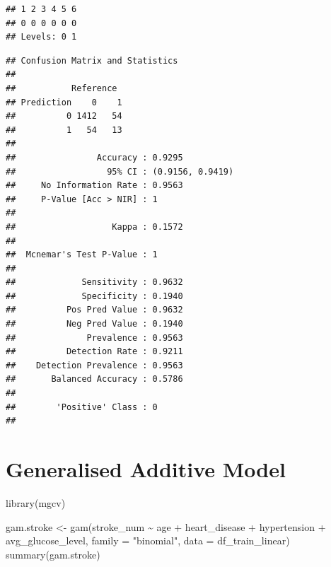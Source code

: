 \documentclass[
]{article}
\newenvironment{Shaded}{\begin{snugshade}}{\end{snugshade}}
\newcommand{\AttributeTok}[1]{\textcolor[rgb]{0.77,0.63,0.00}{#1}}
\newcommand{\CommentTok}[1]{\textcolor[rgb]{0.56,0.35,0.01}{\textit{#1}}}
\newcommand{\FloatTok}[1]{\textcolor[rgb]{0.00,0.00,0.81}{#1}}
\newcommand{\FunctionTok}[1]{\textcolor[rgb]{0.00,0.00,0.00}{#1}}
\newcommand{\NormalTok}[1]{#1}
\newcommand{\OtherTok}[1]{\textcolor[rgb]{0.56,0.35,0.01}{#1}}
\newcommand{\SpecialCharTok}[1]{\textcolor[rgb]{0.00,0.00,0.00}{#1}}
\newcommand{\StringTok}[1]{\textcolor[rgb]{0.31,0.60,0.02}{#1}}
\renewcommand{\=}[1]{\stackrel{#1}{=}}
\theoremstyle{definition}
\theoremstyle{remark}
\begin{document}
\begin{verbatim}
## 1 2 3 4 5 6 
## 0 0 0 0 0 0 
## Levels: 0 1
\end{verbatim}

\begin{Shaded}
\end{Shaded}

\begin{verbatim}
## Confusion Matrix and Statistics
## 
##           Reference
## Prediction    0    1
##          0 1412   54
##          1   54   13
##                                           
##                Accuracy : 0.9295          
##                  95% CI : (0.9156, 0.9419)
##     No Information Rate : 0.9563          
##     P-Value [Acc > NIR] : 1               
##                                           
##                   Kappa : 0.1572          
##                                           
##  Mcnemar's Test P-Value : 1               
##                                           
##             Sensitivity : 0.9632          
##             Specificity : 0.1940          
##          Pos Pred Value : 0.9632          
##          Neg Pred Value : 0.1940          
##              Prevalence : 0.9563          
##          Detection Rate : 0.9211          
##    Detection Prevalence : 0.9563          
##       Balanced Accuracy : 0.5786          
##                                           
##        'Positive' Class : 0               
## 
\end{verbatim}

\hypertarget{generalised-additive-model}{%
\section{Generalised Additive Model}\label{generalised-additive-model}}

\begin{Shaded}
\begin{Highlighting}[]
\FunctionTok{library}\NormalTok{(mgcv)}

\NormalTok{gam.stroke }\OtherTok{\textless{}{-}} \FunctionTok{gam}\NormalTok{(stroke\_num }\SpecialCharTok{\textasciitilde{}}\NormalTok{ age }\SpecialCharTok{+}\NormalTok{ heart\_disease }\SpecialCharTok{+}\NormalTok{ hypertension }\SpecialCharTok{+}\NormalTok{ avg\_glucose\_level,}
\AttributeTok{family =} \StringTok{"binomial"}\NormalTok{,}
\AttributeTok{data =}\NormalTok{ df\_train\_linear)}
\FunctionTok{summary}\NormalTok{(gam.stroke)}
\end{Highlighting}
\end{Shaded}
\end{document}
